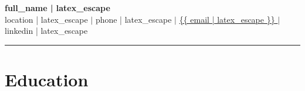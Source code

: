 \documentclass[11pt]{article}
\begin{document}
\small
\renewcommand{\baselinestretch}{0.95}

\begin{center}
  {\LARGE \textbf{ {{ full_name | latex_escape }} }}\\[2pt]
  {{ location | latex_escape }} $|$ {{ phone | latex_escape }} $|$ 
  \url{ {{ email | latex_escape }} } $|$ {{ linkedin | latex_escape }}
\end{center}

\vspace{4pt}
\noindent\rule{\linewidth}{0.4pt}
\vspace{-8pt}

\section*{Education}
\end{document}
